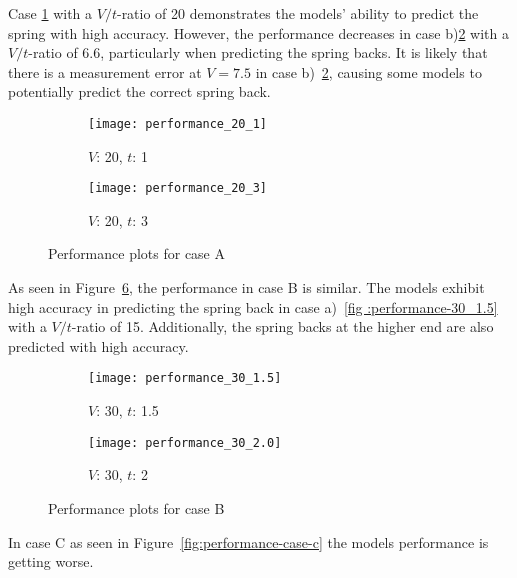 Case \ref{fig:performance-20-1} with a $V/t$-ratio of 20 demonstrates the models'
ability to predict the spring with high accuracy.
However, the performance decreases in case b)\ref{fig:performance-20-3} with a $V/t$-ratio
of 6.6, particularly when predicting the spring backs.
It is likely that there is a measurement error at $V = 7.5$ in case
b)~\ref{fig:performance-20-3}, causing some models to potentially predict the correct
spring back.

\begin{figure}[H]
\begin{tcolorbox}[arc=0pt,boxrule=0.5pt]
\begin{subfigure}{0.5\textwidth}
\texttt{[image: performance\_20\_1]}
\caption{$V$: 20, $t$: 1}
\label{fig:performance-20-1}
\end{subfigure}
\hfill
\begin{subfigure}{0.5\textwidth}
\texttt{[image: performance\_20\_3]}
\caption{$V$: 20, $t$: 3}
\label{fig:performance-20-3}
\end{subfigure}
\end{tcolorbox}
\label{fig:performance-case-a}
\caption{Performance plots for case A}
\end{figure}

As seen in Figure~\ref{fig:performance-case-b}, the performance in case B is similar.
The models exhibit high accuracy in predicting the spring back in case a)~\ref{fig
:performance-30_1.5} with a $V/t$-ratio of 15. Additionally, the spring backs at the
higher end are also predicted with high accuracy.

\begin{figure}[H]
\begin{tcolorbox}[arc=0pt,boxrule=0.5pt]
\begin{subfigure}{0.5\textwidth}
\texttt{[image: performance\_30\_1.5]}
\caption{$V$: 30, $t$: 1.5}
\label{fig:performance-30_1.5}
\end{subfigure}
\hfill
\begin{subfigure}{0.5\textwidth}
\texttt{[image: performance\_30\_2.0]}
\caption{$V$: 30, $t$: 2}
\label{fig:performance-30_2.0}
\end{subfigure}
\end{tcolorbox}
\caption{Performance plots for case B}
\label{fig:performance-case-b}
\end{figure}

In case C as seen in Figure~\ref{fig:performance-case-c} the models performance is
getting worse.

